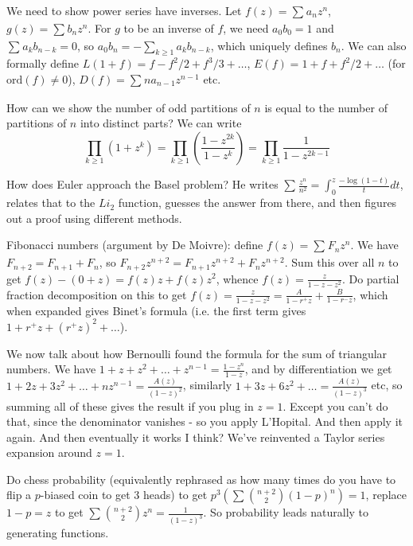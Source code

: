 \documentclass{article}
\theoremstyle{definition}
\theoremstyle{remark}
\begin{document}
We need to show power series have inverses. Let $f(z) = \sum_{}^{} a_nz^{n}$, $g(z) = \sum_{}^{} b_n z^n$. For $g$ to be an inverse of $f$, we need $a_0b_0 = 1$ and $\sum_{}^{} a_kb_{n-k} = 0$, so $a_0b_n = -\sum_{k\ge 1}^{} a_kb_{n-k}$, which uniquely defines $b_n$. We can also formally define $L(1+f) = f - f^2/2 + f^3/3 + \ldots$, $E(f) = 1 +f + f^2/2 + \ldots$ (for $\text{ord}(f)\neq 0$), $D(f) = \sum_{}^{} n a_{n-1}z^{n-1}$ etc.
\vspace{1mm}

How can we show the number of odd partitions of $n$ is equal to the number of partitions of $n$ into distinct parts? We can write \[
\prod_{k\ge 1} (1+z^k) = \prod_{k\ge 1}^{} \left(\frac{1-z^{2k}}{1-z^k}\right) = \prod_{k \ge 1}^{}  \frac{1}{1-z^{2k-1}}
\]

How does Euler approach the Basel problem? He writes $\sum_{}^{} \frac{z^n}{n^2} = \int_{0}^{z} \frac{-\log(1-t)}{t} dt$, relates that to the $Li_2$ function, guesses the answer from there, and then figures out a proof using different methods.
\vspace{1mm}

Fibonacci numbers (argument by De Moivre): define $f(z) = \sum_{}^{} F_n z^n$. We have $F_{n+2} = F_{n+1} + F_n$, so $F_{n+2}z^{n+2} = F_{n+1}z^{n+2}+ F_n z^{n+2}$. Sum this over all $n$ to get $f(z) - (0+z) = f(z)z + f(z)z^2$, whence $f(z) = \frac{z}{1-z-z^2}$. Do partial fraction decomposition on this to get $f(z)=\frac{z}{1-z-z^2} = \frac{A}{1- r^+ z} + \frac{B}{1 - r^- z}$, which when expanded gives Binet's formula (i.e. the first term gives $1+r^+ z + (r^+ z)^2 + \ldots$).  

We now talk about how Bernoulli found the formula for the sum of triangular numbers. We have $1 + z + z^2 + \ldots + z^{n-1} = \frac{1-z^n}{1-z}$, and by differentiation we get $1 + 2z + 3z^2 + \ldots + nz^{n-1} = \frac{A(z)}{(1-z)^2}$, similarly $1 + 3z +6z^2 + \ldots = \frac{A(z)}{(1-z)^3}$ etc, so summing all of these gives the result if you plug in $z=1$. Except you can't do that, since the denominator vanishes - so you apply L'Hopital. And then apply it again. And then eventually it works I think? We've reinvented a Taylor series expansion around $z=1$.

Do chess probability (equivalently rephrased as how many times do you have to flip a $p$-biased coin to get 3 heads) to get $p^3 (\sum_{}^{} {{n+2} \choose {2}} (1-p)^n) = 1$, replace $1-p = z$ to get $\sum_{}^{} {{n+2} \choose 2} z^n = \frac{1}{(1-z)^3}$. So probability leads naturally to generating functions.
\end{document}
